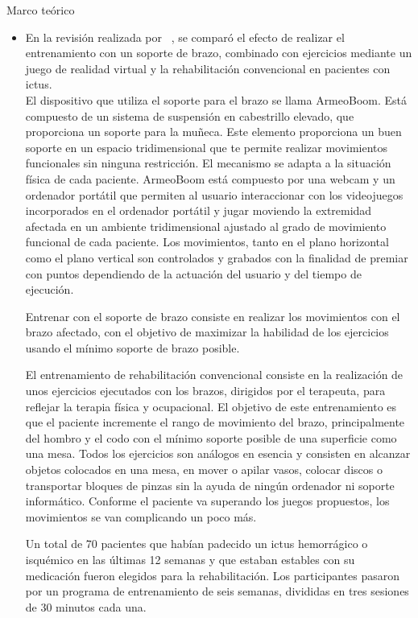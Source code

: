 \begin{thesischapter}{1} {Marco teórico}
\begin{itemize}
        \item En la revisión realizada por ~\cite{doi:10.1177/1545968314535985}, se comparó el efecto de realizar el entrenamiento con un soporte de brazo, combinado con ejercicios mediante un juego de realidad virtual y la rehabilitación convencional en pacientes con ictus.\\ El dispositivo que utiliza el soporte para el brazo se llama ArmeoBoom. Está compuesto de un sistema de suspensión en cabestrillo elevado, que proporciona un soporte para la muñeca. Este elemento proporciona un buen soporte en un espacio tridimensional que te permite realizar movimientos funcionales sin ninguna restricción. El mecanismo se adapta a la situación física de cada paciente. ArmeoBoom está compuesto por una webcam y un ordenador portátil que permiten al usuario interaccionar con los videojuegos incorporados en el ordenador portátil y jugar moviendo la extremidad afectada en un ambiente tridimensional ajustado al grado de movimiento funcional de cada paciente. Los movimientos, tanto en el plano horizontal como el plano vertical son controlados y grabados con la finalidad de premiar con puntos dependiendo de la actuación del usuario y del tiempo de ejecución.
        
        \vspace{2pt}
        Entrenar con el soporte de brazo consiste en realizar los movimientos con el brazo afectado, con el objetivo de maximizar la habilidad de los ejercicios usando el mínimo soporte de brazo posible.
        
        \vspace{2pt}
        El entrenamiento de rehabilitación convencional consiste en la realización de unos ejercicios ejecutados con los brazos, dirigidos por el terapeuta, para reflejar la terapia física y ocupacional. El objetivo de este entrenamiento es que el paciente incremente el rango de movimiento del brazo, principalmente del hombro y el codo con el mínimo soporte posible de una superficie como una mesa. Todos los ejercicios son análogos en esencia y consisten en alcanzar objetos colocados en una mesa, en mover o apilar vasos, colocar discos o transportar bloques de pinzas sin la ayuda de ningún ordenador ni soporte informático. Conforme el paciente va superando los juegos propuestos, los movimientos se van complicando un poco más.

        \vspace{2pt}
        Un total de 70 pacientes que habían padecido un ictus hemorrágico o isquémico en las últimas 12 semanas y que estaban estables con su medicación fueron elegidos para la rehabilitación. Los participantes pasaron por un programa de entrenamiento de seis semanas, divididas en tres sesiones de 30 minutos cada una.
        

\end{itemize}
\end{thesischapter}

